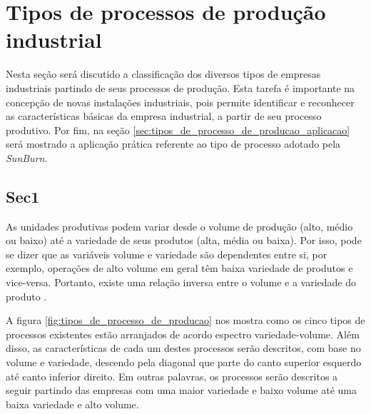 \chapter{Tipos de processos de produção industrial} 
\label{chap:tipos_de_processo_de_producao} 
Nesta seção será discutido a classificação dos diversos tipos de empresas industriais partindo de seus processos de produção. Esta tarefa é importante na concepção de novas instalações industriais, pois permite identificar e reconhecer as características básicas da empresa industrial, a partir de seu processo produtivo. Por fim, na seção \ref{sec:tipos_de_processo_de_producao_aplicacao} será mostrado a aplicação prática referente ao tipo de processo adotado pela \textit{SunBurn}. 

\section{Sec1} 
\label{sec:tipos_de_processo_de_producao_sec1} 
As unidades produtivas podem variar desde o volume de produção (alto, médio ou baixo) até a variedade de seus produtos (alta, média ou baixa). Por isso, pode se dizer que as variáveis volume e variedade são dependentes entre si, por exemplo, operações de alto volume em geral têm baixa variedade de produtos e vice-versa. Portanto, existe uma relação inversa entre o volume e a variedade do produto \cite{slack2009administraccao}.

A figura \ref{fig:tipos_de_processo_de_producao} nos mostra como os cinco tipos de processos existentes estão arranjados de acordo espectro variedade-volume. Além disso, as características de cada um destes processos serão descritos, com base no volume e variedade, descendo pela diagonal que parte do canto superior esquerdo até canto inferior direito. Em outras palavras, os processos serão descritos a seguir partindo das empresas com uma maior variedade e baixo volume até uma baixa variedade e alto volume. 

